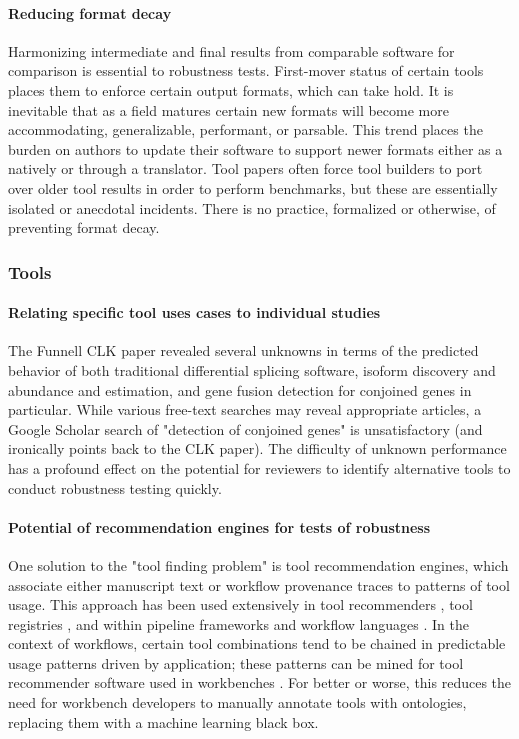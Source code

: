 \documentclass{drexelthesis}
\begin{document}
\paragraph{Reducing format decay}

Harmonizing intermediate and final results from comparable software for comparison is essential to robustness tests. First-mover status of certain tools places them to enforce certain output formats, which can take hold. It is inevitable that as a field matures certain new formats will become more accommodating, generalizable, performant, or parsable. This trend places the burden on authors to update their software to support newer formats either as a natively or through a translator. Tool papers often force tool builders to port over older tool results in order to perform benchmarks, but these are essentially isolated or anecdotal incidents. There is no practice, formalized or otherwise, of preventing format decay.

\subsubsection{Tools}

\paragraph{Relating specific tool uses cases to individual studies}

The Funnell CLK paper revealed several unknowns in terms of the predicted behavior of both traditional differential splicing software, isoform discovery and abundance and estimation, and gene fusion detection for conjoined genes in particular. While various free-text searches may reveal appropriate articles, a Google Scholar search of "detection of conjoined genes" is unsatisfactory (and ironically points back to the CLK paper). The difficulty of unknown performance has a profound effect on the potential for reviewers to identify alternative tools to conduct robustness testing quickly.

\paragraph{Potential of recommendation engines for tests of robustness}

One solution to the "tool finding problem" is tool recommendation engines, which associate either manuscript text or workflow provenance traces to patterns of tool usage. This approach has been used extensively in tool recommenders \cite{Palmblad2019-uk}, tool registries \cite{Hillion2017-wg}, and within pipeline frameworks and workflow languages \cite{Bedo2019-ip,Amstutz2015-fa}. In the context of workflows, certain tool combinations tend to be chained in predictable usage patterns driven by application; these patterns can be mined for tool recommender software used in workbenches \cite{Kumar2019-xq}. For better or worse, this reduces the need for workbench developers to manually annotate tools with ontologies, replacing them with a machine learning black box.
\end{document}
